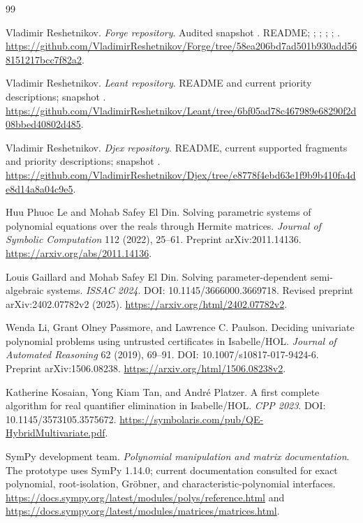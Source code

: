 \clearpage
\begin{thebibliography}{99}
Vladimir Reshetnikov. \emph{Forge repository}. Audited snapshot
.
README; ; ;
; ;
.
\url{https://github.com/VladimirReshetnikov/Forge/tree/58ea206bd7ad501b930add568151217bcc7f82a2}.

Vladimir Reshetnikov. \emph{Leant repository}. README and current priority descriptions; snapshot
.
\url{https://github.com/VladimirReshetnikov/Leant/tree/6bf05ad78c467989e68290f2d08bbed40802d485}.

Vladimir Reshetnikov. \emph{Djex repository}. README, current supported fragments and priority descriptions; snapshot
.
\url{https://github.com/VladimirReshetnikov/Djex/tree/e8778f4ebd63e1f9b9b410fa4de8d14a8a04c9e5}.

Huu Phuoc Le and Mohab Safey El Din. Solving parametric systems of polynomial equations over the reals through Hermite matrices. \emph{Journal of Symbolic Computation} 112 (2022), 25--61. Preprint arXiv:2011.14136.
\url{https://arxiv.org/abs/2011.14136}.

Louis Gaillard and Mohab Safey El Din. Solving parameter-dependent semi-algebraic systems. \emph{ISSAC 2024}. DOI: 10.1145/3666000.3669718. Revised preprint arXiv:2402.07782v2 (2025).
\url{https://arxiv.org/html/2402.07782v2}.

Wenda Li, Grant Olney Passmore, and Lawrence C. Paulson. Deciding univariate polynomial problems using untrusted certificates in Isabelle/HOL. \emph{Journal of Automated Reasoning} 62 (2019), 69--91. DOI: 10.1007/s10817-017-9424-6. Preprint arXiv:1506.08238.
\url{https://arxiv.org/html/1506.08238v2}.

Katherine Kosaian, Yong Kiam Tan, and Andr\'e Platzer. A first complete algorithm for real quantifier elimination in Isabelle/HOL. \emph{CPP 2023}. DOI: 10.1145/3573105.3575672.
\url{https://symbolaris.com/pub/QE-HybridMultivariate.pdf}.

SymPy development team. \emph{Polynomial manipulation and matrix documentation}. The prototype uses SymPy 1.14.0; current documentation consulted for exact polynomial, root-isolation, Gr\"obner, and characteristic-polynomial interfaces.
\url{https://docs.sympy.org/latest/modules/polys/reference.html} and
\url{https://docs.sympy.org/latest/modules/matrices/matrices.html}.


\end{thebibliography}
